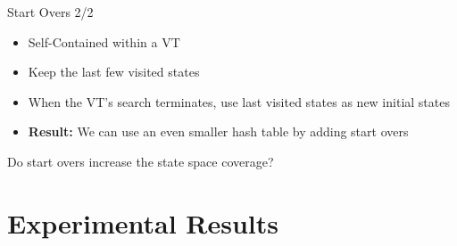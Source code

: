 \documentclass[aspectratio=169]{beamer}
\begin{document}
\begin{frame}{Start Overs 2/2}
    \begin{itemize}
        \item Self-Contained within a VT
        \item Keep the last few visited states
        \item When the VT's search terminates, use last visited states as new initial states
        \item \textbf{Result:} We can use an even smaller hash table by adding start overs
    \end{itemize}

    Do start overs increase the state space coverage?
\end{frame}

\section{Experimental Results}
\end{document}
